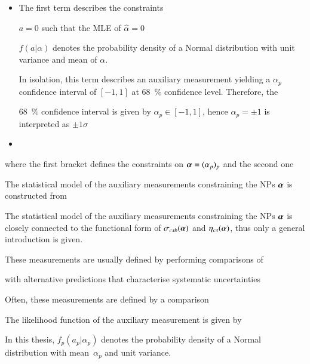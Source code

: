 \begin{itemize}

\item

  The first term describes the constraints

  $a = 0$ such that the MLE of $\hat{\alpha} = 0$

  $f(a \vert \alpha)$ denotes the probability density of a Normal distribution
  with unit variance and mean of $\alpha$.

  In isolation, this term describes an auxiliary measurement yielding a
  $\alpha_p$ confidence interval of $[-1, 1]$ at \SI{68}{\percent} confidence
  level. Therefore, the

  \SI{68}{\percent} confidence interval is given by $\alpha_p \in [-1, 1]$,
  hence $\alpha_p = \pm 1$ is interpreted as $\pm 1 \sigma$

\item

\end{itemize}


where the first bracket defines the constraints on
$\myvec{\alpha} = (\alpha_p)_p$ and the second one



The statistical model of
the auxiliary measurements constraining the NPs $\myvec{\alpha}$ is constructed
from







The statistical model of the auxiliary measurements constraining the NPs
$\myvec{\alpha}$ is closely connected to the functional form of
$\sigma_{csb}(\myvec{\alpha})$ and $\eta_{cs}(\myvec{\alpha})$, thus only a
general introduction is given.





These measurements are usually defined by performing comparisons of


with alternative predictions that characterise systematic uncertainties





Often, these
measurements are defined by a comparison





The likelihood function of the auxiliary measurement is given by


In this thesis, $f_p(a_p \vert \alpha_p)$ denotes the probability density of a
Normal distribution with mean~$\alpha_p$ and unit variance.


